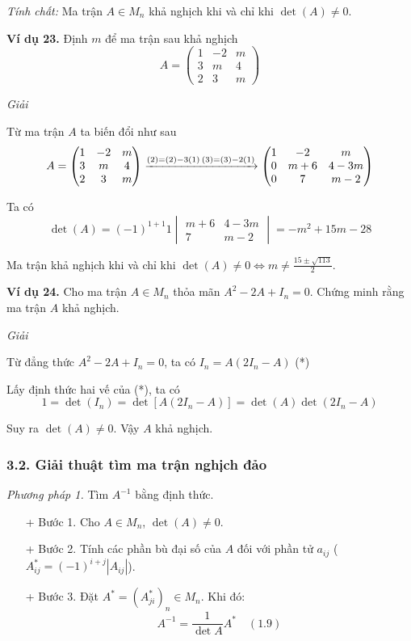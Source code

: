 \textit{Tính chất:} Ma trận \( A \in M_n \) khả nghịch khi và chỉ khi \(\det(A) \neq 0\).

\textbf{Ví dụ 23.} Định \( m \) để ma trận sau khả nghịch
\[
A = \begin{pmatrix}
1 & -2 & m \\
3 & m & 4 \\
2 & 3 & m
\end{pmatrix}
\]

\textit{Giải}

Từ ma trận \( A \) ta biến đổi như sau
\[
A = \begin{pmatrix}
1 & -2 & m \\
3 & m & 4 \\
2 & 3 & m
\end{pmatrix}
\xrightarrow{(2)=(2)-3(1) \\ (3)=(3)-2(1)}
\begin{pmatrix}
1 & -2 & m \\
0 & m+6 & 4-3m \\
0 & 7 & m-2
\end{pmatrix}
\]

Ta có
\[
\det(A) = (-1)^{1+1} 1 \begin{vmatrix}
m+6 & 4-3m \\
7 & m-2
\end{vmatrix} = -m^2 + 15m - 28
\]

Ma trận khả nghịch khi và chỉ khi \(\det(A) \neq 0 \Leftrightarrow m \neq \frac{15 \pm \sqrt{113}}{2} \).

\textbf{Ví dụ 24.} Cho ma trận \( A \in M_n \) thỏa mãn \( A^2 - 2A + I_n = 0 \). Chứng minh rằng ma trận \( A \) khả nghịch.

\textit{Giải}

Từ đẳng thức \( A^2 - 2A + I_n = 0 \), ta có \( I_n = A(2I_n - A) \) (*)

Lấy định thức hai vế của (*), ta có
\[
1 = \det(I_n) = \det[A(2I_n - A)] = \det(A)\det(2I_n - A)
\]

Suy ra \(\det(A) \neq 0\). Vậy \( A \) khả nghịch.

\subsubsection*{3.2. Giải thuật tìm ma trận nghịch đảo}

\textit{Phương pháp 1.} Tìm \( A^{-1} \) bằng định thức.
\begin{itemize}
    \item[+] Bước 1. Cho \( A \in M_n \), \(\det(A) \neq 0\).
    \item[+] Bước 2. Tính các phần bù đại số của \(A\) đối với phần tử \(a_{ij}\) (\(A_{ij}^* = (-1)^{i+j} \left|A_{ij}\right|\)).
    \item[+] Bước 3. Đặt \(A^* = (A_{ji}^*)_n \in M_n\). Khi đó:
    \[
    A^{-1} = \frac{1}{\det A} A^* \quad (1.9)
    \]
\end{itemize}
    

